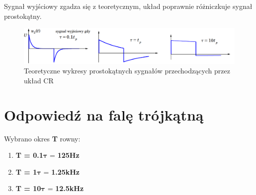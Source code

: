 Sygnał wyjściowy zgadza się z teoretycznym, układ poprawnie różniczkuje sygnał prostokątny.

\begin{figure}[H]
    \centering
    \includegraphics[width=\textwidth]{img_wyklad/teor_pros_CR.png}
    \caption{Teoretyczne wykresy prostokątnych sygnałów przechodzących przez układ CR}
    \label{fig:my_label}
\end{figure}

\newpage

\section{Odpowiedź na falę trójkątną}

Wybrano okres \textbf{T} rowny:
\begin{enumerate}
    \label{poprawa:dodanie_wartosci_tau_3_3}
    \item \textbf{T = 0.1}$\boldsymbol{\tau}$ = \textbf{125Hz}
    \item \textbf{T = 1}$\boldsymbol{\tau}$ = \textbf{1.25kHz}
    \item \textbf{T = 10}$\boldsymbol{\tau}$ = \textbf{12.5kHz}
\end{enumerate}

